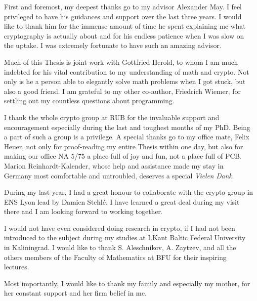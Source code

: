 First and foremost, my deepest thanks go to my advisor Alexander May. I feel privileged to have his guidances and support over the last three years. I would like to thank him for the immense amount of time he spent explaining me what cryptography is actually about and for his endless patience when I was slow on the uptake. I was extremely fortunate to have such an amazing advisor.

Much of this Thesis is joint work with Gottfried Herold, to whom I am much indebted for his vital contribution to my understanding of math and crypto. Not only is he a person able to elegantly solve math problems when I got stuck, but also a good friend. I am grateful to my other co-author, Friedrich Wiemer, for settling out my countless questions about programming.

I thank the whole crypto group at RUB for the invaluable support and encouragement especially during the last and toughest months of my PhD. Being a part of such a group is a privilege. A special thanks go to my office mate, Felix Heuer, not only for proof-reading my entire Thesis within one day, but also for making our office NA 5/75 a place full of joy and fun, not a place full of PCB. Marion Reinhardt-Kalender, whose help and assistance made my stay in Germany most comfortable and untroubled, deserves a special \textit{Vielen Dank}.

During my last year, I had a great honour to collaborate with the crypto group in ENS Lyon lead by Damien Stehl{\'e}. I have learned a great deal during my visit there and I am looking forward to working together.

I would not have even considered doing research in crypto, if I had not been introduced to the subject during my studies at I.Kant Baltic Federal University in Kaliningrad. I would like to thank S. Aleschnikov, A. Zaytzev, and all the others members of the Faculty of Mathematics at BFU for their inspiring lectures.


Most importantly, I would like to thank my family and especially my mother, for her constant support and her firm belief in me. 





